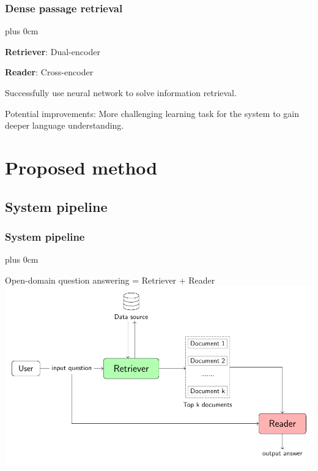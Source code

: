 \documentclass[11pt]{beamer}
\renewcommand{\raggedright}{\leftskip=0pt \rightskip=0pt plus 0cm}
\let\olditemize=\itemize
\renewenvironment{itemize}{\olditemize\raggedright}{\endlist}
\begin{document}
\begin{frame}
\frametitle{Dense passage retrieval}
\begin{itemize}
	\item \textbf{Retriever}: Dual-encoder
	\item \textbf{Reader}: Cross-encoder
	\item Successfully use neural network to solve information retrieval.
	\item Potential improvements: More challenging learning task for the system to gain deeper language understanding.
\end{itemize}
\end{frame}
\section{Proposed method}
\subsection{System pipeline}
\begin{frame}
\frametitle{System pipeline}
\begin{itemize}
	\item Open-domain question answering = Retriever + Reader
\end{itemize}
\hspace*{-15pt}
\includegraphics[scale=.68]{images/PDF/overall_arch/architecture.pdf}
\end{frame}
\end{document}
